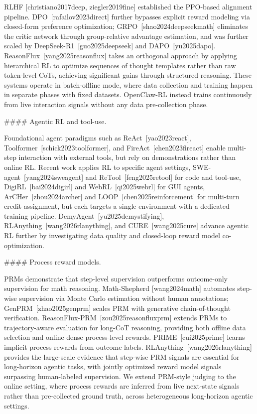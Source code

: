 RLHF [christiano2017deep, ziegler2019fine] established the PPO-based alignment pipeline. DPO [rafailov2023direct] further bypasses explicit reward modeling via closed-form preference optimization; GRPO [shao2024deepseekmath] eliminates the critic network through group-relative advantage estimation, and was further scaled by DeepSeek-R1 [guo2025deepseek] and DAPO [yu2025dapo]. ReasonFlux [yang2025reasonflux] takes an orthogonal approach by applying hierarchical RL to optimize sequences of thought templates rather than raw token-level CoTs, achieving significant gains through structured reasoning. These systems operate in batch-offline mode, where data collection and training happen in separate phases with fixed datasets. OpenClaw-RL instead trains continuously from live interaction signals without any data pre-collection phase.

#### Agentic RL and tool-use.

Foundational agent paradigms such as ReAct [yao2023react], Toolformer [schick2023toolformer], and FireAct [chen2023fireact] enable multi-step interaction with external tools, but rely on demonstrations rather than online RL. Recent work applies RL to specific agent settings, SWE-agent [yang2024sweagent] and ReTool [feng2025retool] for code and tool-use, DigiRL [bai2024digirl] and WebRL [qi2025webrl] for GUI agents, ArCHer [zhou2024archer] and LOOP [chen2025reinforcement] for multi-turn credit assignment, but each targets a single environment with a dedicated training pipeline. DemyAgent [yu2025demystifying], RLAnything [wang2026rlanything], and CURE [wang2025cure] advance agentic RL further by investigating data quality and closed-loop reward model co-optimization.

#### Process reward models.

PRMs demonstrate that step-level supervision outperforms outcome-only supervision for math reasoning. Math-Shepherd [wang2024math] automates step-wise supervision via Monte Carlo estimation without human annotations; GenPRM [zhao2025genprm] scales PRM with generative chain-of-thought verification. ReasonFlux-PRM [zou2025reasonfluxprm] extends PRMs to trajectory-aware evaluation for long-CoT reasoning, providing both offline data selection and online dense process-level rewards. PRIME [cui2025prime] learns implicit process rewards from outcome labels. RLAnything [wang2026rlanything] provides the large-scale evidence that step-wise PRM signals are essential for long-horizon agentic tasks, with jointly optimized reward model signals surpassing human-labeled supervision. We extend PRM-style judging to the online setting, where process rewards are inferred from live next-state signals rather than pre-collected ground truth, across heterogeneous long-horizon agentic settings.

